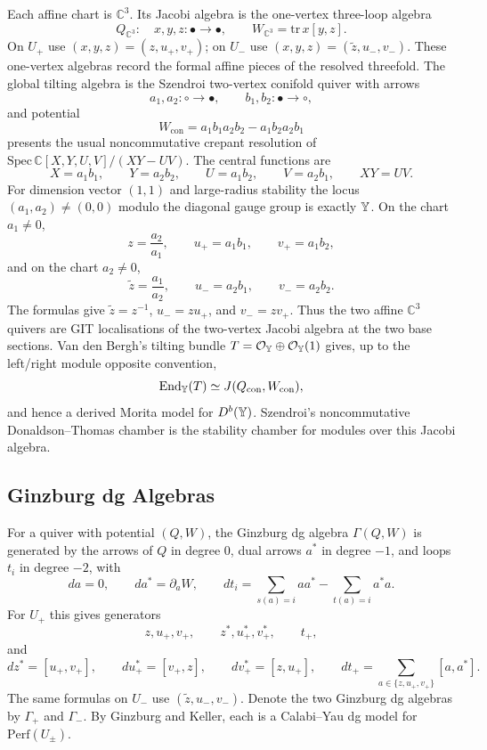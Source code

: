 Each affine chart is $\mathbb C^3$. Its Jacobi algebra is the
one-vertex three-loop algebra
\[
  Q_{\mathbb C^3}:\quad x,y,z:\bullet\to\bullet,\qquad
  W_{\mathbb C^3}=\mathrm{tr}\,x[y,z].
\]
On $U_+$ use $(x,y,z)=(z,u_+,v_+)$; on $U_-$ use
$(x,y,z)=(\tilde z,u_-,v_-)$. These one-vertex algebras record the
formal affine pieces of the resolved threefold. The global tilting
algebra is the Szendroi two-vertex conifold quiver with arrows
\[
  a_1,a_2:\circ\to\bullet,\qquad b_1,b_2:\bullet\to\circ,
\]
and potential
\[
  W_{\mathrm{con}}=a_1b_1a_2b_2-a_1b_2a_2b_1
\]
presents the usual noncommutative crepant resolution of
$\mathrm{Spec}\,\mathbb C[X,Y,U,V]/(XY-UV)$. The central functions are
\[
  X=a_1b_1,\qquad Y=a_2b_2,\qquad U=a_1b_2,\qquad V=a_2b_1,
  \qquad XY=UV .
\]
For dimension vector $(1,1)$ and large-radius stability the locus
$(a_1,a_2)\neq(0,0)$ modulo the diagonal gauge group is exactly
$\mathbb{Y}$. On the chart $a_1\neq0$,
\[
  z=\frac{a_2}{a_1},\qquad u_+=a_1b_1,\qquad v_+=a_1b_2,
\]
and on the chart $a_2\neq0$,
\[
  \tilde z=\frac{a_1}{a_2},\qquad u_-=a_2b_1,\qquad v_-=a_2b_2.
\]
The formulas give $\tilde z=z^{-1}$, $u_-=zu_+$, and $v_-=zv_+$.
Thus the two affine $\mathbb C^3$ quivers are GIT localisations of the
two-vertex Jacobi algebra at the two base sections. Van den Bergh's
tilting bundle $T=\mathcal{O}_{\mathbb{Y}}\oplus\mathcal{O}_{\mathbb{Y}}(1)$ gives, up to the
left/right module opposite convention,
\[
  \mathrm{End}_{\mathbb{Y}}(T)
  \simeq J(Q_{\mathrm{con}},W_{\mathrm{con}}),
\]
and hence a derived Morita model for $D^b(\mathbb{Y})$. Szendroi's
noncommutative Donaldson--Thomas chamber is the stability chamber for
modules over this Jacobi algebra.

\subsection*{Ginzburg dg Algebras}

For a quiver with potential $(Q,W)$, the Ginzburg dg algebra
$\Gamma(Q,W)$ is generated by the arrows of $Q$ in degree $0$, dual
arrows $a^*$ in degree $-1$, and loops $t_i$ in degree $-2$, with
\[
  da=0,\qquad da^*=\partial_a W,\qquad
  dt_i=\sum_{s(a)=i}aa^*-\sum_{t(a)=i}a^*a .
\]
For $U_+$ this gives generators
\[
  z,u_+,v_+,\qquad z^*,u_+^*,v_+^*,\qquad t_+,
\]
and
\[
  dz^*=[u_+,v_+],\qquad du_+^*=[v_+,z],\qquad
  dv_+^*=[z,u_+],\qquad dt_+=\sum_{a\in\{z,u_+,v_+\}}[a,a^*].
\]
The same formulas on $U_-$ use $(\tilde z,u_-,v_-)$. Denote the two
Ginzburg dg algebras by $\Gamma_+$ and $\Gamma_-$. By Ginzburg and
Keller, each is a Calabi--Yau dg model for $\mathrm{Perf}(U_\pm)$.

